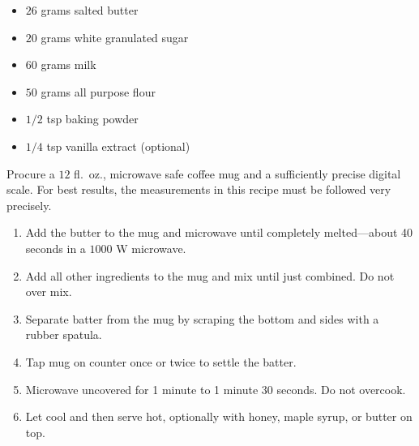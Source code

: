 \documentclass{article}
\begin{document}
\thispagestyle{firstpage}

\ingredients
\begin{itemize}
    \item $26$ grams salted butter
    \item $20$ grams white granulated sugar
    \item $60$ grams milk
    \item $50$ grams all purpose flour
    \item $1/2$ tsp baking powder
    \item $1/4$ tsp vanilla extract (optional)
\end{itemize}

\instructions
Procure a $12$ fl.\ oz., microwave safe coffee mug and a sufficiently precise digital scale. For best results, the measurements in this recipe must be followed very precisely.
\begin{enumerate}
    \item Add the butter to the mug and microwave until completely melted---about 40 seconds in a $1000$ W microwave.
    \item Add all other ingredients to the mug and mix until just combined. Do not over mix.
    \item Separate batter from the mug by scraping the bottom and sides with a rubber spatula.
    \item Tap mug on counter once or twice to settle the batter.
    \item Microwave uncovered for 1 minute to 1 minute 30 seconds. Do not overcook.
    \item Let cool and then serve hot, optionally with honey, maple syrup, or butter on top.
\end{enumerate}

\spewfootnotes
\end{document}
